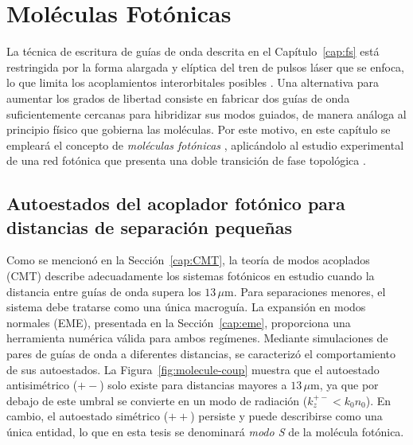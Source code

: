 \chapter{Moléculas Fotónicas}

La técnica de escritura de guías de onda descrita en el Capítulo~\ref{cap:fs} está restringida por la forma alargada y elíptica del tren de pulsos láser que se enfoca, lo que limita los acoplamientos interorbitales posibles \citep{interorbital}. Una alternativa para aumentar los grados de libertad consiste en fabricar dos guías de onda suficientemente cercanas para hibridizar sus modos guiados, de manera análoga al principio físico que gobierna las moléculas. Por este motivo, en este capítulo se empleará el concepto de \textit{moléculas fotónicas} \citep{molecules}, aplicándolo al estudio experimental de una red fotónica que presenta una doble transición de fase topológica \citep{SPSSH}.

\section{Autoestados del acoplador fotónico para distancias de separación pequeñas}

Como se mencionó en la Sección~\ref{cap:CMT}, la teoría de modos acoplados (CMT) describe adecuadamente los sistemas fotónicos en estudio cuando la distancia entre guías de onda supera los $13\,\mu$m. Para separaciones menores, el sistema debe tratarse como una única macroguía. La expansión en modos normales (EME), presentada en la Sección~\ref{cap:eme}, proporciona una herramienta numérica válida para ambos regímenes. 
Mediante simulaciones de pares de guías de onda a diferentes distancias, se caracterizó el comportamiento de sus autoestados. La Figura~\ref{fig:molecule-coup} muestra que el autoestado antisimétrico ($+-$) solo existe para distancias mayores a $13\,\mu$m, ya que por debajo de este umbral se convierte en un modo de radiación ($k_z^{+-} < k_0 n_0$). En cambio, el autoestado simétrico ($++$) persiste y puede describirse como una única entidad, lo que en esta tesis se denominará \textit{modo S} de la molécula fotónica.

